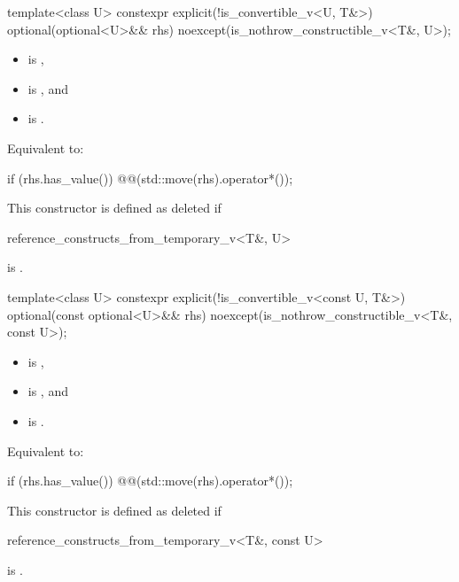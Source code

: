 \begin{itemdecl}
template<class U>
  constexpr explicit(!is_convertible_v<U, T&>)
  optional(optional<U>&& rhs) noexcept(is_nothrow_constructible_v<T&, U>);
\end{itemdecl}

\begin{itemdescr}
\pnum
\constraints
\begin{itemize}
\item {} is ,
\item {} is , and
\item {} is .
\end{itemize}

\pnum
\effects
Equivalent to:
\begin{codeblock}
if (rhs.has_value()) @@(std::move(rhs).operator*());
\end{codeblock}

\pnum
\remarks
This constructor is defined as deleted if
\begin{codeblock}
reference_constructs_from_temporary_v<T&, U>
\end{codeblock}
is .
\end{itemdescr}

\begin{itemdecl}
template<class U>
  constexpr explicit(!is_convertible_v<const U, T&>)
  optional(const optional<U>&& rhs) noexcept(is_nothrow_constructible_v<T&, const U>);
\end{itemdecl}

\begin{itemdescr}
\pnum
\constraints
\begin{itemize}
\item {} is ,
\item {} is , and
\item {} is .
\end{itemize}

\pnum
\effects
Equivalent to:
\begin{codeblock}
if (rhs.has_value()) @@(std::move(rhs).operator*());
\end{codeblock}

\pnum
\remarks
This constructor is defined as deleted if
\begin{codeblock}
reference_constructs_from_temporary_v<T&, const U>
\end{codeblock}
is .
\end{itemdescr}

